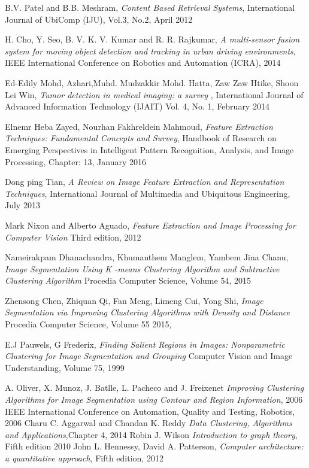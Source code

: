 \documentclass{usiinftr}
\begin{document}
\newpage
\begin{thebibliography}{1}
	
	
	B.V. Patel and B.B. Meshram,
	\textit{Content Based Retrieval Systems},
	International Journal of UbiComp (IJU), Vol.3, No.2, 
	April 2012
	
	H. Cho, Y. Seo, B. V. K. V. Kumar and R. R. Rajkumar, 
	\textit{A multi-sensor fusion system for moving object detection and tracking in urban driving environments}, 
	IEEE International Conference on Robotics and Automation (ICRA), 
	2014
	
	Ed-Edily Mohd,  Azhari,Muhd. Mudzakkir Mohd. Hatta, Zaw Zaw Htike,  Shoon Lei Win, 
	\textit{Tumor detection in medical imaging: a survey }, 
	International Journal of Advanced Information Technology (IJAIT) Vol. 4, No. 1, 
	February 2014
	
		Elnemr Heba Zayed, Nourhan Fakhreldein Mahmoud, 
		\textit{Feature Extraction Techniques: Fundamental Concepts and Survey},
		Handbook of Research on Emerging Perspectives in Intelligent Pattern Recognition, Analysis, and Image Processing, Chapter: 13,
		January 2016
		
		Dong ping  Tian, 
		\textit{A Review on Image Feature Extraction and Representation Techniques},
		International Journal of Multimedia and Ubiquitous Engineering,
		July 2013
		
		Mark Nixon and Alberto Aguado, 
		\textit{Feature Extraction and Image Processing for Computer Vision} Third edition,
		2012
		
		Nameirakpam Dhanachandra, Khumanthem Manglem, Yambem Jina Chanu,  
		\textit{Image Segmentation Using K -means Clustering Algorithm and Subtractive Clustering Algorithm} 
		Procedia Computer Science, Volume 54,
		2015
		
		Zhensong Chen, Zhiquan Qi, Fan Meng, Limeng Cui, Yong Shi,
		\textit{Image Segmentation via Improving Clustering Algorithms with Density and Distance} 
		Procedia Computer Science,
Volume 55
		2015,
		
		E.J Pauwels, G Frederix,
		\textit{Finding Salient Regions in Images: Nonparametric Clustering for Image Segmentation and Grouping} 
		Computer Vision and Image Understanding, Volume 75,
		1999
	

		A. Oliver, X. Munoz, J. Batlle, L. Pacheco and J. Freixenet
		\textit{Improving Clustering Algorithms for Image Segmentation using Contour and Region Information},
		2006 IEEE International Conference on Automation, Quality and Testing, Robotics,
		2006
		Charu C. Aggarwal  and Chandan K. Reddy
		\textit{Data Clustering, Algorithms and Applications},Chapter 4,
		2014
		Robin J. Wilson
		\textit{Introduction to graph theory}, Fifth edition
		2010
		John L. Hennessy, David A. Patterson,
		\textit{Computer architecture: a quantitative approach}, Fifth edition,
		2012
\end{thebibliography}


\end{document}
